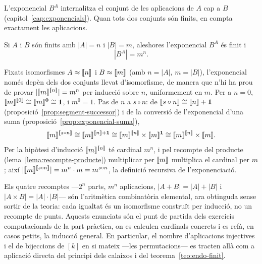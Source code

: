 L'exponencial \(B^{A}\) internalitza el conjunt de les aplicacions de
\(A\) cap a \(B\) (capítol~\ref{cap:exponencials}). Quan tots dos conjunts
són finits, en compta exactament les aplicacions.

\begin{teorema}\label{teo:nombre-aplicacions}
Si \(A\) i \(B\) són finits amb \(|A|=n\) i \(|B|=m\), aleshores
l'exponencial \(B^{A}\) és finit i
\[
|B^{A}|=m^{n} .
\]
\end{teorema}

\begin{prova}
Fixats isomorfismes \(A\approx\llbracket n\rrbracket\) i \(B\approx\llbracket m\rrbracket\) (amb
\(n=|A|\), \(m=|B|\)), l'exponencial només depèn dels dos conjunts llevat
d'isomorfisme, de manera que n'hi ha prou de provar
\(|\llbracket m\rrbracket^{\llbracket n\rrbracket}|=m^{n}\) per inducció sobre \(n\), uniformement en
\(m\). Per a \(n=0\), \(\llbracket m\rrbracket^{\llbracket 0\rrbracket}\cong\llbracket m\rrbracket^{\mathbf0}\cong
\mathbf1\), i \(m^{0}=1\). Pas de \(n\) a \(s\circ n\): de
\(\llbracket s\circ n\rrbracket\cong\llbracket n\rrbracket+\mathbf1\)
(proposició~\ref{prop:segment-successor}) i de la conversió de
l'exponencial d'una suma (proposició~\ref{prop:exponencial-suma}),
\[
\llbracket m\rrbracket^{\llbracket s\circ n\rrbracket}\cong\llbracket m\rrbracket^{\llbracket n\rrbracket+\mathbf1}\cong
\llbracket m\rrbracket^{\llbracket n\rrbracket}\times\llbracket m\rrbracket^{\mathbf1}\cong\llbracket m\rrbracket^{\llbracket n\rrbracket}\times\llbracket m\rrbracket .
\]
Per la hipòtesi d'inducció \(\llbracket m\rrbracket^{\llbracket n\rrbracket}\) té cardinal \(m^{n}\), i
pel recompte del producte (lema~\ref{lema:recompte-producte}) multiplicar
per \(\llbracket m\rrbracket\) multiplica el cardinal per \(m\); així
\(|\llbracket m\rrbracket^{\llbracket s\circ n\rrbracket}|=m^{n}\cdot m=m^{s\circ n}\), la definició
recursiva de l'exponenciació.
\end{prova}

\begin{observacio}\label{obs:recompte-classica}
Els quatre recomptes ---\(2^{n}\) parts, \(m^{n}\) aplicacions,
\(|A+B|=|A|+|B|\) i \(|A\times B|=|A|\cdot|B|\)--- són l'aritmètica
combinatòria elemental, ara obtinguda sense sortir de la teoria: cada
igualtat és un isomorfisme construït per inducció, no un recompte de
punts. Aquests enunciats són el punt de partida dels exercicis
computacionals de la part pràctica, on es calculen cardinals concrets i
es refà, en casos petits, la inducció general. En particular, el nombre
d'aplicacions injectives i el de bijeccions de \([k]\) en si mateix
---les permutacions--- es tracten allà com a aplicació directa del
principi dels calaixos i del teorema~\ref{teo:endo-finit}.
\end{observacio}

